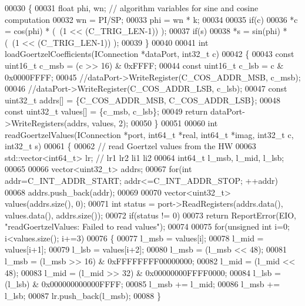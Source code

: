 \begin{DoxyCode}
00030 \{
00031     \textcolor{keywordtype}{float} phi, wn; \textcolor{comment}{// algorithm variables for sine and cosine computation}
00032     wn = PI/SP;
00033     phi = wn * k;
00034 
00035     \textcolor{keywordflow}{if}(c)
00036         *c =  cos(phi) * (~(1 << (C_TRIG_LEN-1)) );
00037     \textcolor{keywordflow}{if}(s)
00038         *s =  sin(phi) * (~(1 << (C_TRIG_LEN-1)) );
00039 \}
00040 
00041 \textcolor{keywordtype}{int} loadGoertzelCoefficients(IConnection *dataPort, int32\_t c)
00042 \{
00043     \textcolor{keyword}{const} uint16\_t c\_msb = (c >> 16) & 0xFFFF;
00044     \textcolor{keyword}{const} uint16\_t c\_lsb =  c & 0x0000FFFF;
00045     \textcolor{comment}{//dataPort->WriteRegister(C\_COS\_ADDR\_MSB, c\_msb);}
00046     \textcolor{comment}{//dataPort->WriteRegister(C\_COS\_ADDR\_LSB, c\_lsb);}
00047     \textcolor{keyword}{const} uint32\_t addrs[] = \{C_COS_ADDR_MSB, C_COS_ADDR_LSB\};
00048     \textcolor{keyword}{const} uint32\_t values[] = \{c\_msb, c\_lsb\};
00049     \textcolor{keywordflow}{return} dataPort->WriteRegisters(addrs, values, 2);
00050 \}
00051 
00060 \textcolor{keywordtype}{int} readGoertzelValues(IConnection *port, int64\_t *real, int64\_t *imag, int32\_t c, int32\_t s)
00061 \{
00062     \textcolor{comment}{// read Goertzel values from the HW}
00063     std::vector<int64\_t> lr;  \textcolor{comment}{// lr1 lr2 li1 li2}
00064     int64\_t l\_msb, l\_mid, l\_lsb;
00065 
00066     vector<uint32\_t> addrs;
00067     \textcolor{keywordflow}{for}(\textcolor{keywordtype}{int} addr=C_INT_ADDR_START; addr<=C_INT_ADDR_STOP; ++addr)
00068         addrs.push\_back(addr);
00069 
00070     vector<uint32\_t> values(addrs.size(), 0);
00071     \textcolor{keywordtype}{int} status = port->ReadRegisters(addrs.data(), values.data(), addrs.size());
00072     \textcolor{keywordflow}{if}(status != 0)
00073         \textcolor{keywordflow}{return} ReportError(EIO, \textcolor{stringliteral}{"readGoertzelValues: Failed to read values"});
00074 
00075     \textcolor{keywordflow}{for}(\textcolor{keywordtype}{unsigned} \textcolor{keywordtype}{int} i=0; i<values.size(); i+=3)
00076     \{
00077         l\_msb = values[i];
00078         l\_mid = values[i+1];
00079         l\_lsb = values[i+2];
00080         l\_msb = (l\_msb << 48);
00081         l\_msb = (l\_msb >> 16) & 0xFFFFFFFF00000000;
00082         l\_mid = (l\_mid << 48);
00083         l\_mid = (l\_mid >> 32) & 0x00000000FFFF0000;
00084         l\_lsb = (l\_lsb) & 0x000000000000FFFF;
00085         l\_msb += l\_mid;
00086         l\_msb += l\_lsb;
00087         lr.push\_back(l\_msb);
00088     \}

\end{DoxyCode}
